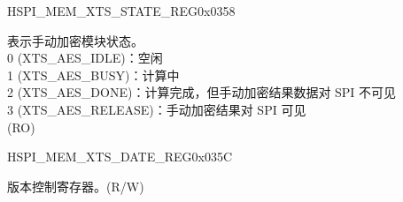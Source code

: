\begin{register}{H}{SPI\_MEM\_XTS\_STATE\_REG}{0x0358}\label{regdesc:SPIMEMXTSSTATEREG}
%
%
\regnewline%
\begin{regdesc}\begin{reglist}
\label{fielddesc:SPIMEMXTSSTATE}\item [SPI\_MEM\_XTS\_STATE] 表示手动加密模块状态。\\
0 (XTS\_AES\_IDLE)：空闲\\
1 (XTS\_AES\_BUSY)：计算中\\
2 (XTS\_AES\_DONE)：计算完成，但手动加密结果数据对 SPI 不可见\\
3 (XTS\_AES\_RELEASE)：手动加密结果对 SPI 可见\\
(RO)
\end{reglist}\end{regdesc}
\end{register}


\begin{register}{H}{SPI\_MEM\_XTS\_DATE\_REG}{0x035C}\label{regdesc:SPIMEMXTSDATEREG}
%
%
\regnewline%
\begin{regdesc}\begin{reglist}
\label{fielddesc:SPIMEMXTSDATE}\item [SPI\_MEM\_XTS\_DATE] 版本控制寄存器。(R/W)
\end{reglist}\end{regdesc}
\end{register}
